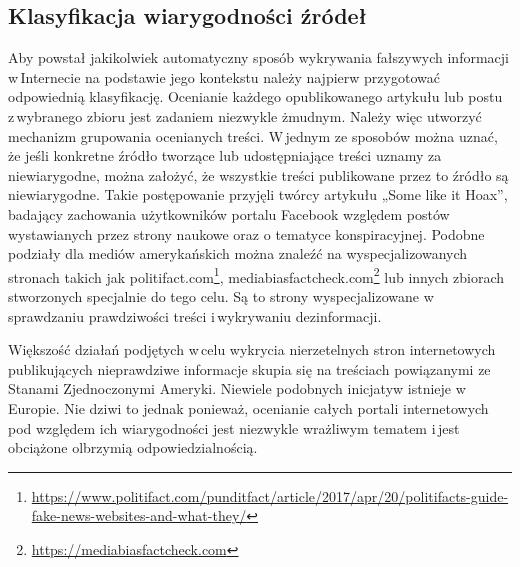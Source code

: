 \subsection{Klasyfikacja wiarygodności źródeł}
Aby powstał jakikolwiek automatyczny sposób wykrywania fałszywych informacji w\,Internecie na podstawie jego kontekstu należy najpierw przygotować odpowiednią klasyfikację. Ocenianie każdego opublikowanego artykułu lub postu z\,wybranego zbioru jest zadaniem niezwykle żmudnym. Należy więc utworzyć mechanizm grupowania ocenianych treści. W\,jednym ze sposobów można uznać, że jeśli konkretne źródło tworzące lub udostępniające treści uznamy za niewiarygodne, można założyć, że wszystkie treści publikowane przez to źródło są niewiarygodne. Takie postępowanie przyjęli twórcy artykułu „Some like it Hoax”\cite{tacchini2017some}, badający zachowania użytkowników portalu Facebook względem postów wystawianych przez strony naukowe oraz o tematyce konspiracyjnej. Podobne podziały dla mediów amerykańskich można znaleźć na wyspecjalizowanych stronach takich jak politifact.com\footnote{\url{https://www.politifact.com/punditfact/article/2017/apr/20/politifacts-guide-fake-news-websites-and-what-they/}},  mediabiasfactcheck.com\footnote{\url{https://mediabiasfactcheck.com}}  lub innych zbiorach stworzonych specjalnie do tego celu. Są to strony wyspecjalizowane w\,sprawdzaniu prawdziwości treści i\,wykrywaniu dezinformacji. 
\par
Większość działań podjętych w\,celu wykrycia nierzetelnych stron internetowych publikujących nieprawdziwe informacje skupia się na treściach powiązanymi ze Stanami Zjednoczonymi Ameryki. Niewiele podobnych inicjatyw istnieje w\,Europie. Nie dziwi to jednak ponieważ, ocenianie całych portali internetowych pod względem ich wiarygodności jest niezwykle wrażliwym tematem i\,jest obciążone olbrzymią odpowiedzialnością. 

